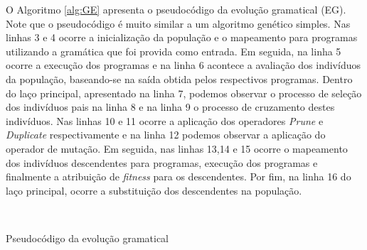 O Algoritmo \ref{alg:GE} apresenta o pseudocódigo da evolução gramatical (EG). Note que o pseudocódigo é muito similar a um algoritmo genético simples. Nas linhas 3 e 4 ocorre a inicialização da população e o mapeamento para programas utilizando a gramática que foi provida como entrada. Em seguida, na linha 5 ocorre a execução dos programas e na linha 6 acontece a avaliação dos indivíduos da população, baseando-se na saída obtida pelos respectivos programas. Dentro do laço principal, apresentado na linha 7, podemos observar o processo de seleção dos indivíduos pais na linha 8 e na linha 9 o processo de cruzamento destes indivíduos. Nas linhas 10 e 11 ocorre a aplicação dos operadores \textit{Prune} e \textit{Duplicate} respectivamente e na linha 12 podemos observar a aplicação do operador de mutação. Em seguida, nas linhas 13,14 e 15 ocorre o mapeamento dos indivíduos descendentes para programas, execução dos programas e finalmente a atribuição de \textit{fitness} para os descendentes. Por fim, na linha 16 do laço principal, ocorre a substituição dos descendentes na população. 



\begin{algorithm}[htb!]
	
	
	\begin{algorithmic}[1]
%		
		\While{Condição de parada não atingida}
		\EndWhile \\
			
			
		
	\end{algorithmic}
	\caption{Pseudocódigo da evolução gramatical}
	\label{alg:GE}
\end{algorithm}


